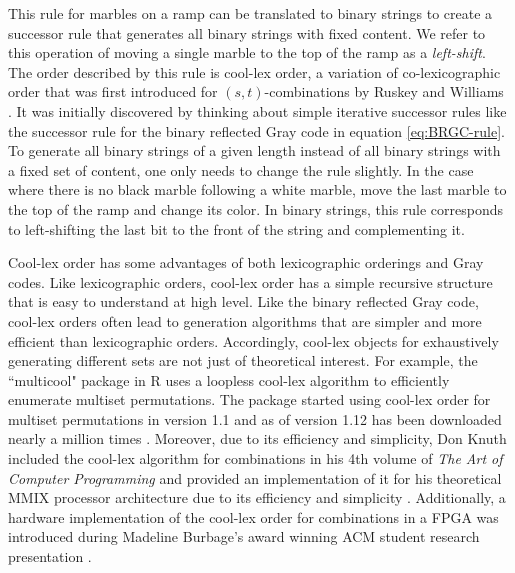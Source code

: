 This rule for marbles on a ramp can be translated to binary strings to create a successor rule that generates all binary strings with fixed content.  We refer to this operation of moving a single marble to the top of the ramp as a \emph{left-shift}.
The order described by this rule is 
cool-lex order, a variation of co-lexicographic order that was first introduced for $(s,t)$-combinations by Ruskey and Williams \cite{ruskey2005generating} \cite{ruskey2008generating}.  It was initially discovered by thinking about simple iterative successor rules like the successor rule for the binary reflected Gray code in equation \ref{eq:BRGC-rule}. To generate all binary strings of a given length instead of all binary strings with a fixed set of content, one only needs to change the rule slightly.  In the case where there is no black marble following a white marble, move the last marble to the top of the ramp and change its color.  In binary strings, this rule corresponds to left-shifting the last bit to the front of the string and complementing it.

Cool-lex order has some advantages of both lexicographic orderings and Gray codes.  Like lexicographic orders, cool-lex order has a simple recursive structure that is easy to understand at  high level.  
Like the binary reflected Gray code, cool-lex orders often lead to generation algorithms that are simpler and more efficient than lexicographic orders.  Accordingly, cool-lex objects for exhaustively generating different sets are not just of theoretical interest.
For example, the ``multicool" package in R uses a loopless cool-lex algorithm to efficiently enumerate multiset permutations.   The package started using cool-lex order for multiset permutations in version 1.1 and as of version 1.12 has been downloaded nearly a million times \cite{multicool_2021}.  Moreover, due to its efficiency and simplicity, Don Knuth included the cool-lex algorithm for combinations in his 4th volume of \emph{The Art of Computer Programming} and provided an implementation of it for his theoretical MMIX processor architecture due to its efficiency and simplicity \cite{knuth2015art}.  Additionally, a hardware implementation of the cool-lex order for combinations in a FPGA was introduced during Madeline Burbage's award winning ACM student research presentation \cite{burbage2020cool}.





